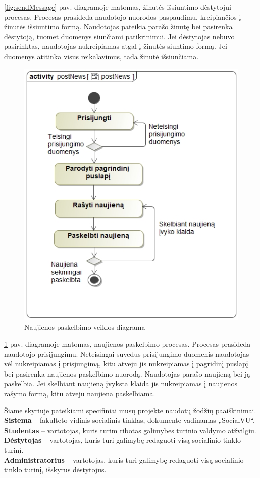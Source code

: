 \documentclass{VUMIFPSkursinis}
\begin{document}
	\ref{fig:sendMessage} pav. diagramoje matomas, žinutės išsiuntimo dėstytojui procesas. Procesas prasideda naudotojo
	nuorodos paspaudimu, kreipiančios į žinutės išsiuntimo formą. Naudotojas pateikia parašo žinutę bei pasirenka dėstytoją, tuomet duomenys siunčiami patikrinimui. Jei dėstytojas nebuvo pasirinktas, naudotojas nukreipiamas
	atgal į žinutės siuntimo formą. Jei duomenys atitinka visus reikalavimus, tada žinutė išsiunčiama.
	\begin{figure}[H]
		\centering
		\includegraphics[scale=0.65]{img/postNews.jpg}
		\caption{Naujienos paskelbimo veiklos diagrama}
		\label{fig:postNews}
	\end{figure}
	\ref{fig:postNews} pav. diagramoje matomas, naujienos paskelbimo procesas. Procesas prasideda naudotojo prisijungimu. Neteisingai suvedus prisijungimo duomenis naudotojas vėl nukreipiamas į prisjungimą, kitu atveju jis nukreipiamas į pagridinį puslapį bei pasirenka naujienos paskelbimo nuorodą. Naudotojas parašo naujieną bei ją paskelbia. Jei skelbiant naujieną įvyksta klaida jis nukreipiamas į naujienos rašymo formą, kitu atveju naujiena paskelbiama.
	\newpage
	
	Šiame skyriuje pateikiami specifiniai mūsų projekte naudotų žodžių paaiškinimai. \\
	\textbf{Sistema} – fakulteto vidinis socialinis tinklas, dokumente vadinamas „SocialVU“. \\
	\textbf{Studentas} – vartotojas, kuris turim ribotas galimybes turinio valdymo atžvilgiu.\\
	\textbf{Dėstytojas} – vartotojas, kuris turi galimybę redaguoti visą socialinio tinklo turinį.\\
	\textbf{Administratorius} – vartotojas, kuris turi galimybę redaguoti visą socialinio tinklo turinį, išskyrus dėstytojus.
	\newpage
	
\end{document}
